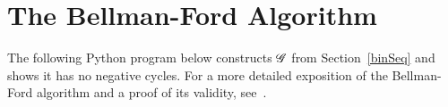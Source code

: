 \appendix
\section{The Bellman-Ford Algorithm} \label{bfAlg}
The following Python program below constructs $\mathscr{G}$ from Section~\ref{binSeq}
and shows it has no negative cycles. For a more detailed exposition of the
Bellman-Ford algorithm and a proof of its validity, see~\cite{bellmanford}.

\bigskip
\SMALL

\normalsize
